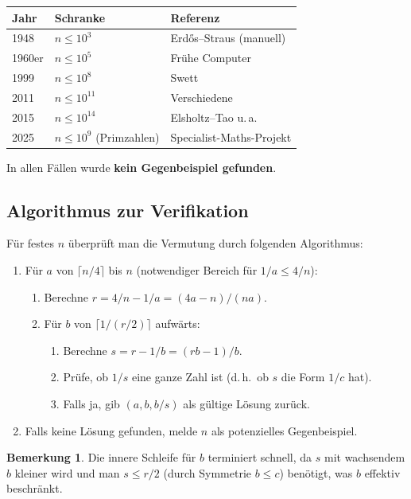 \documentclass[12pt,a4paper]{amsart}
\theoremstyle{definition}
\newtheorem{remark}[theorem]{Bemerkung}
\begin{document}
\begin{center}
\begin{tabular}{lll}
\toprule
Jahr & Schranke & Referenz \\
\midrule
1948 & $n \leq 10^3$ & Erd\H{o}s--Straus (manuell) \\
1960er & $n \leq 10^5$ & Frühe Computer \\
1999 & $n \leq 10^8$ & Swett \\
2011 & $n \leq 10^{11}$ & Verschiedene \\
2015 & $n \leq 10^{14}$ & Elsholtz--Tao u.\,a. \\
2025 & $n \leq 10^9$ (Primzahlen) & Specialist-Maths-Projekt \\
\bottomrule
\end{tabular}
\end{center}

In allen Fällen wurde \textbf{kein Gegenbeispiel gefunden}.

\subsection{Algorithmus zur Verifikation}

Für festes $n$ überprüft man die Vermutung durch folgenden Algorithmus:

\begin{enumerate}
\item Für $a$ von $\lceil n/4 \rceil$ bis $n$ (notwendiger Bereich für $1/a \leq 4/n$):
  \begin{enumerate}
  \item Berechne $r = 4/n - 1/a = (4a - n)/(na)$.
  \item Für $b$ von $\lceil 1/(r/2) \rceil$ aufwärts:
    \begin{enumerate}
    \item Berechne $s = r - 1/b = (rb - 1)/b$.
    \item Prüfe, ob $1/s$ eine ganze Zahl ist (d.\,h.\ ob $s$ die Form $1/c$ hat).
    \item Falls ja, gib $(a, b, b/s)$ als gültige Lösung zurück.
    \end{enumerate}
  \end{enumerate}
\item Falls keine Lösung gefunden, melde $n$ als potenzielles Gegenbeispiel.
\end{enumerate}

\begin{remark}
Die innere Schleife für $b$ terminiert schnell, da $s$ mit wachsendem $b$
kleiner wird und man $s \leq r/2$ (durch Symmetrie $b \leq c$) benötigt,
was $b$ effektiv beschränkt.
\end{remark}
\end{document}
